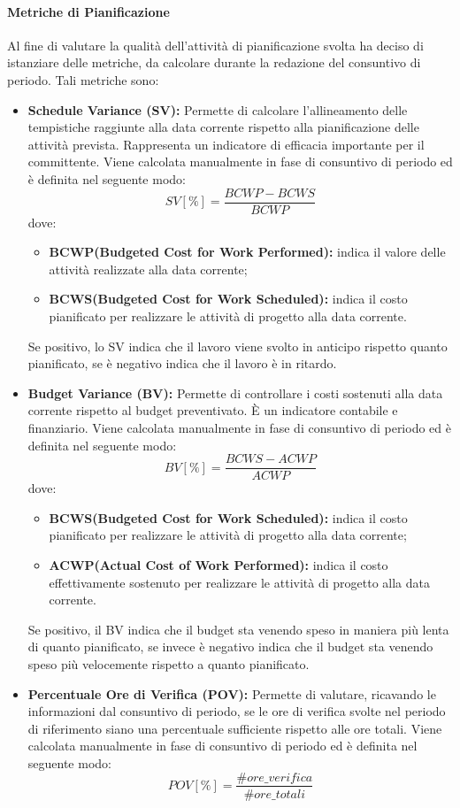 \paragraph{Metriche di Pianificazione} Al fine di valutare la qualità dell'attività di pianificazione svolta \groupName{} ha deciso di istanziare delle metriche, da calcolare durante la redazione del consuntivo di periodo. Tali metriche sono:
\begin{itemize}
	\item \textbf{Schedule Variance (SV):}\label{metrics:SV} Permette di calcolare l'allineamento delle tempistiche raggiunte alla data corrente rispetto alla pianificazione delle attività prevista. 
	Rappresenta un indicatore di efficacia importante per il committente. Viene calcolata manualmente in fase di consuntivo di periodo ed è definita nel seguente modo:
	$$
	SV[\%]=\frac{BCWP-BCWS}{BCWP} 
	$$ 	
	dove:
	\begin{itemize}
		\item \textbf{BCWP(Budgeted Cost for Work Performed):} indica il valore delle attività realizzate alla data
		corrente;
		\item \textbf{BCWS(Budgeted Cost for Work Scheduled):}  indica il costo pianificato per realizzare le attività
		di progetto alla data corrente.
	\end{itemize}
	Se positivo, lo SV indica che il lavoro viene svolto in anticipo rispetto quanto pianificato, se è negativo indica che il lavoro è in ritardo.
	
	\item \textbf{Budget Variance (BV):}\label{metrics:BV} Permette di controllare i costi sostenuti alla data corrente rispetto al budget preventivato. È un indicatore contabile e finanziario. Viene calcolata manualmente in fase di consuntivo di periodo ed è definita nel seguente modo:
	$$
	BV[\%]=\frac{BCWS-ACWP}{ACWP} 
	$$ 
	dove: 
	\begin{itemize}
		\item \textbf{BCWS(Budgeted Cost for Work Scheduled):}  indica il costo pianificato per realizzare le attività di progetto alla data corrente;
		\item \textbf{ACWP(Actual Cost of Work Performed):} indica il costo effettivamente sostenuto per realizzare le attività di progetto alla data corrente.
	\end{itemize}
	Se positivo, il BV indica che il budget sta venendo speso in maniera più lenta di quanto pianificato, se invece è negativo indica che il budget sta venendo speso più velocemente rispetto a quanto pianificato.
	\item \textbf{Percentuale Ore di Verifica (POV): }\label{metrics:POV} Permette di valutare, ricavando le informazioni dal consuntivo di periodo, se le ore di verifica svolte nel periodo di riferimento siano una percentuale sufficiente rispetto alle ore totali. Viene calcolata manualmente in fase di consuntivo di periodo ed è definita nel seguente modo:
	$$
	POV[\%]=\frac{\#ore\_verifica}{\#ore\_totali} 
	$$ 
	
\end{itemize}
